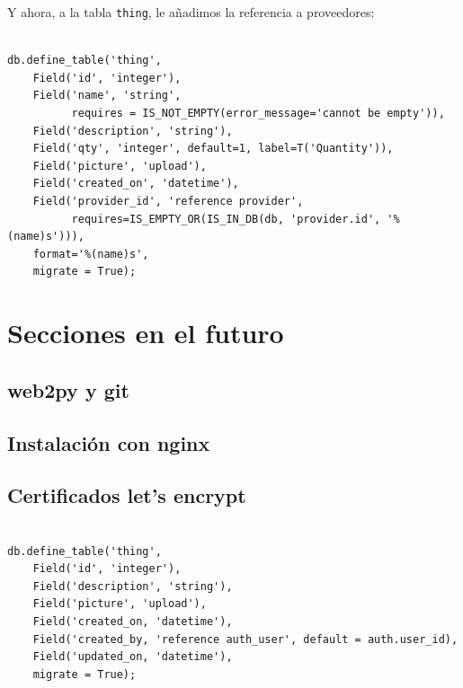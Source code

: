 \documentclass[
  12pt,
  spanish,
]{article}
\begin{document}
Y ahora, a la tabla \texttt{thing}, le añadimos la referencia a
proveedores:

\begin{verbatim}

db.define_table('thing',
    Field('id', 'integer'),
    Field('name', 'string', 
          requires = IS_NOT_EMPTY(error_message='cannot be empty')),
    Field('description', 'string'),
    Field('qty', 'integer', default=1, label=T('Quantity')),
    Field('picture', 'upload'),
    Field('created_on', 'datetime'),
    Field('provider_id', 'reference provider',
          requires=IS_EMPTY_OR(IS_IN_DB(db, 'provider.id', '%(name)s'))),
    format='%(name)s',
    migrate = True);
\end{verbatim}

\hypertarget{secciones-en-el-futuro}{%
\section{Secciones en el futuro}\label{secciones-en-el-futuro}}

\hypertarget{web2py-y-git}{%
\subsection{web2py y git}\label{web2py-y-git}}

\hypertarget{instalaciuxf3n-con-nginx}{%
\subsection{Instalación con nginx}\label{instalaciuxf3n-con-nginx}}

\hypertarget{certificados-lets-encrypt}{%
\subsection{Certificados let's
encrypt}\label{certificados-lets-encrypt}}

\begin{verbatim}

db.define_table('thing',
    Field('id', 'integer'),
    Field('description', 'string'),
    Field('picture', 'upload'),
    Field('created_on, 'datetime'),
    Field('created_by, 'reference auth_user', default = auth.user_id),
    Field('updated_on, 'datetime'),
    migrate = True);
\end{verbatim}
\end{document}
